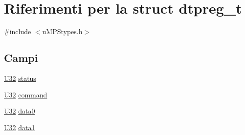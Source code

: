 \hypertarget{structdtpreg__t}{\section{Riferimenti per la struct dtpreg\-\_\-t}
\label{structdtpreg__t}
}


{\ttfamily \#include $<$u\-M\-P\-Stypes.\-h$>$}

\subsection*{Campi}
\begin{DoxyCompactItemize}
\item 
\hyperlink{base_8h_ac3df7cf3c8cb172a588adec881447d68}{U32} \hyperlink{structdtpreg__t_ae37efb991e613c0dc476ece5ed4ffa71}{status}
\item 
\hyperlink{base_8h_ac3df7cf3c8cb172a588adec881447d68}{U32} \hyperlink{structdtpreg__t_a8538fdce575b580097b18700c560a5a8}{command}
\item 
\hyperlink{base_8h_ac3df7cf3c8cb172a588adec881447d68}{U32} \hyperlink{structdtpreg__t_a8a0c321ffd2847534bfd0bc849a972b4}{data0}
\item 
\hyperlink{base_8h_ac3df7cf3c8cb172a588adec881447d68}{U32} \hyperlink{structdtpreg__t_a6eef7e2e6f5e38b7d153e3f25d6fefb8}{data1}
\end{DoxyCompactItemize}


